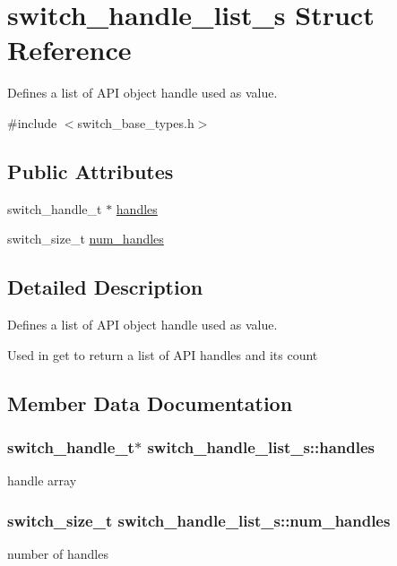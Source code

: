 \hypertarget{structswitch__handle__list__s}{\section{switch\+\_\+handle\+\_\+list\+\_\+s Struct Reference}
\label{structswitch__handle__list__s}
}


Defines a list of A\+P\+I object handle used as value.  




{\ttfamily \#include $<$switch\+\_\+base\+\_\+types.\+h$>$}

\subsection*{Public Attributes}
\begin{DoxyCompactItemize}
\item 
switch\+\_\+handle\+\_\+t $\ast$ \hyperlink{structswitch__handle__list__s_a54f9cd525f567a952a7595e1a91cf36d}{handles}
\item 
switch\+\_\+size\+\_\+t \hyperlink{structswitch__handle__list__s_a7873ec59cf103f5f9637f89e23ec211e}{num\+\_\+handles}
\end{DoxyCompactItemize}


\subsection{Detailed Description}
Defines a list of A\+P\+I object handle used as value. 

Used in get to return a list of A\+P\+I handles and its count 

\subsection{Member Data Documentation}
\hypertarget{structswitch__handle__list__s_a54f9cd525f567a952a7595e1a91cf36d}{
\subsubsection[{handles}]{\setlength{\rightskip}{0pt plus 5cm}switch\+\_\+handle\+\_\+t$\ast$ switch\+\_\+handle\+\_\+list\+\_\+s\+::handles}}\label{structswitch__handle__list__s_a54f9cd525f567a952a7595e1a91cf36d}
handle array \hypertarget{structswitch__handle__list__s_a7873ec59cf103f5f9637f89e23ec211e}{
\subsubsection[{num\+\_\+handles}]{\setlength{\rightskip}{0pt plus 5cm}switch\+\_\+size\+\_\+t switch\+\_\+handle\+\_\+list\+\_\+s\+::num\+\_\+handles}}\label{structswitch__handle__list__s_a7873ec59cf103f5f9637f89e23ec211e}
number of handles 

